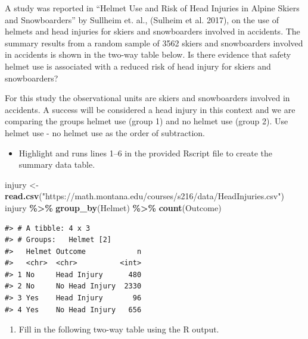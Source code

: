 \documentclass[
]{report}
\newenvironment{Shaded}{\begin{snugshade}}{\end{snugshade}}
\newcommand{\FunctionTok}[1]{\textcolor[rgb]{0.13,0.29,0.53}{\textbf{#1}}}
\newcommand{\NormalTok}[1]{#1}
\newcommand{\OtherTok}[1]{\textcolor[rgb]{0.56,0.35,0.01}{#1}}
\newcommand{\SpecialCharTok}[1]{\textcolor[rgb]{0.81,0.36,0.00}{\textbf{#1}}}
\newcommand{\StringTok}[1]{\textcolor[rgb]{0.31,0.60,0.02}{#1}}
\providecommand{\tightlist}{%
  \setlength{\itemsep}{0pt}\setlength{\parskip}{0pt}}
\begin{document}
A study was reported in ``Helmet Use and Risk of Head Injuries in Alpine Skiers and Snowboarders'' by Sullheim et. al., (Sulheim et al. 2017), on the use of helmets and head injuries for skiers and snowboarders involved in accidents. The summary results from a random sample of 3562 skiers and snowboarders involved in accidents is shown in the two-way table below. Is there evidence that safety helmet use is associated with a reduced risk of head injury for skiers and snowboarders?

For this study the observational units are skiers and snowboarders involved in accidents. A success will be considered a head injury in this context and we are comparing the groups helmet use (group 1) and no helmet use (group 2). Use helmet use - no helmet use as the order of subtraction.

\begin{itemize}
\tightlist
\item
  Highlight and runs lines 1--6 in the provided Rscript file to create the summary data table.
\end{itemize}

\begin{Shaded}
\begin{Highlighting}[]
\NormalTok{injury }\OtherTok{\textless{}{-}} \FunctionTok{read.csv}\NormalTok{(}\StringTok{"https://math.montana.edu/courses/s216/data/HeadInjuries.csv"}\NormalTok{) }
\NormalTok{injury }\SpecialCharTok{\%\textgreater{}\%} \FunctionTok{group\_by}\NormalTok{(Helmet) }\SpecialCharTok{\%\textgreater{}\%} \FunctionTok{count}\NormalTok{(Outcome)}
\end{Highlighting}
\end{Shaded}

\begin{verbatim}
#> # A tibble: 4 x 3
#> # Groups:   Helmet [2]
#>   Helmet Outcome            n
#>   <chr>  <chr>          <int>
#> 1 No     Head Injury      480
#> 2 No     No Head Injury  2330
#> 3 Yes    Head Injury       96
#> 4 Yes    No Head Injury   656
\end{verbatim}

\begin{enumerate}
\def\labelenumi{\arabic{enumi}.}
\tightlist
\item
  Fill in the following two-way table using the R output.
\end{enumerate}
\end{document}
